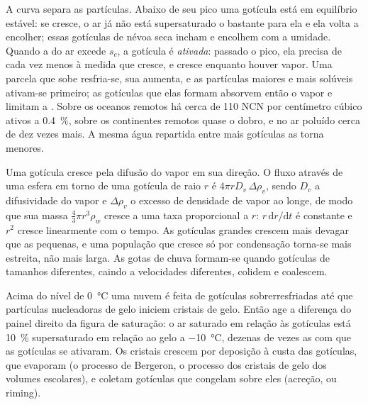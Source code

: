 A curva separa as partículas. Abaixo de seu pico uma gotícula está em equilíbrio estável: se cresce,
o ar já não está supersaturado o bastante para ela e ela volta a encolher; essas gotículas de névoa seca incham
e encolhem com a umidade. Quando a  do ar excede $s_c$, a gotícula é
\emph{ativada}: passado o pico, ela precisa de cada vez menos  à medida que cresce, e cresce
enquanto houver vapor. Uma parcela que sobe resfria-se, sua  aumenta, e as partículas maiores
e mais solúveis ativam-se primeiro; as gotículas que elas formam absorvem então o vapor e
limitam a . Sobre os oceanos remotos há cerca de 110 NCN por centímetro cúbico ativos
a \qty{0.4}{\percent}, sobre os continentes remotos quase o dobro, e no ar poluído cerca de
dez vezes mais. A mesma água repartida entre mais gotículas as torna menores.

\begin{remark}\label{rem:b2:atmospheric-thermodynamics:growth}
Uma gotícula cresce pela difusão do vapor em sua direção. O fluxo através de uma esfera em torno de uma gotícula
de raio $r$ é $4\pi r D_v\,\Delta\rho_v$, sendo $D_v$ a difusividade do vapor e
$\Delta\rho_v$ o excesso de densidade de vapor ao longe, de modo que sua massa $\tfrac43\pi r^3\rho_w$ cresce
a uma taxa proporcional a $r$: $r\,\mathrm{d}r/\mathrm{d}t$ é constante e $r^2$ cresce linearmente com o
tempo. As gotículas grandes crescem mais devagar que as pequenas, e uma população que cresce só por condensação
torna-se mais estreita, não mais larga. As gotas de chuva formam-se quando gotículas de tamanhos diferentes, caindo a
velocidades diferentes, colidem e coalescem.
\end{remark}

Acima do nível de \qty{0}{\celsius} uma nuvem é feita de gotículas sobrerresfriadas até que partículas
nucleadoras de gelo iniciem cristais de gelo. Então age a diferença do painel direito da
figura de saturação: o ar saturado em relação às gotículas está \qty{10}{\percent} supersaturado em relação ao
gelo a \qty{-10}{\celsius}, dezenas de vezes as  com que as gotículas se ativaram.
Os cristais crescem por deposição à custa das gotículas, que evaporam (o processo de
Bergeron, o processo dos cristais de gelo dos volumes escolares), e coletam gotículas que congelam
sobre eles (acreção, ou riming).

